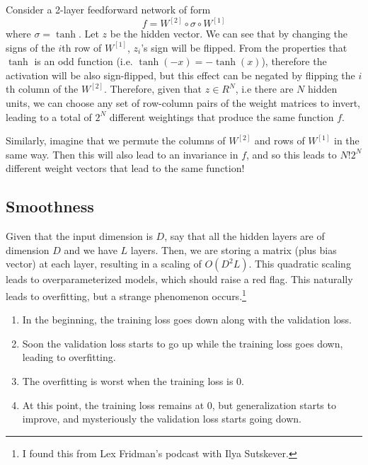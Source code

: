   \begin{theorem}
    Consider a 2-layer feedforward network of form 
    \begin{equation}
      f = W^{[2]} \circ \sigma \circ W^{[1]}
    \end{equation} 
    where $\sigma = \tanh$. Let $z$ be the hidden vector. We can see that by changing the signs of the $i$th row of $W^{[1]}$, $z_i$'s sign will be flipped. From the properties that $\tanh$ is an odd function (i.e. $\tanh(-x) = - \tanh(x)$), therefore the activation will be also sign-flipped, but this effect can be negated by flipping the $i$th column of the $W^{[2]}$. Therefore, given that $z \in R^{N}$, i.e there are $N$ hidden units, we can choose any set of row-column pairs of the weight matrices to invert, leading to a total of $2^N$ different weightings that produce the same function $f$. 

    Similarly, imagine that we permute the columns of $W^{[2]}$ and rows of $W^{[1]}$ in the same way. Then this will also lead to an invariance in $f$, and so this leads to $N! 2^N$ different weight vectors that lead to the same function! 
  \end{theorem}

\subsection{Smoothness} 

  Given that the input dimension is $D$, say that all the hidden layers are of dimension $D$ and we have $L$ layers. Then, we are storing a matrix (plus bias vector) at each layer, resulting in a scaling of $O(D^2 L)$. This quadratic scaling leads to overparameterized models, which should raise a red flag. This naturally leads to overfitting, but a strange phenomenon occurs.\footnote{I found this from Lex Fridman's podcast with Ilya Sutskever.}  
  \begin{enumerate}
    \item In the beginning, the training loss goes down along with the validation loss. 
    \item Soon the validation loss starts to go up while the training loss goes down, leading to overfitting. 
    \item The overfitting is worst when the training loss is $0$. 
    \item At this point, the training loss remains at $0$, but generalization starts to improve, and mysteriously the validation loss starts going down. 
  \end{enumerate}

